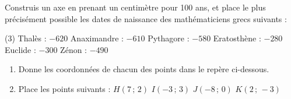 \documentclass[../Chapitre2.tex]{subfiles}
\begin{document}


\begin{enonce}
  Construis un axe en prenant un centimètre pour 100 ans, et place le plus précisément possible les dates de naissance des mathématiciens grecs suivants :

\begin{tasks}[style=itemize](3)
  \task Thalès : $-620$
  \task Anaximandre : $-610$
  \task Pythagore : $-580$
  \task Eratosthène : $-280$
  \task Euclide  : $-300$
  \task Zénon : $-490$
\end{tasks}

\end{enonce}



\begin{enonce}

\begin{enumerate}
  \item Donne les coordonnées de chacun des points dans le repère ci-dessous.
  \item Place les points suivants : \hfill $H(7\,;\,2)$ \hfill  $I(-3\,;\,3)$ \hfill  $J(-8\,;\,0)$ \hfill  $K(2\,;\,-3)$ \hfill
\end{enumerate}

\bigskip

\end{enonce}
\end{document}

